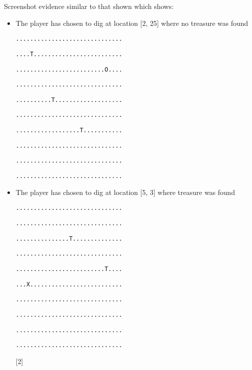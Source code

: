 Screenshot evidence similar to that shown which shows: 
\begin{itemize}
\item The player has chosen to dig at location {[}2, 25{]} where no treasure
was found 

\noindent\begin{minipage}[t]{1\columnwidth}%
\texttt{.............................. }

\texttt{....T......................... }

\texttt{.........................O.... }

\texttt{..............................}

\texttt{..........T................... }

\texttt{.............................. }

\texttt{..................T........... }

\texttt{.............................. }

\texttt{.............................. }

\texttt{..............................}%
\end{minipage}
\item The player has chosen to dig at location {[}5, 3{]} where treasure
was found 

\noindent\begin{minipage}[t]{1\columnwidth}%
\texttt{.............................. }

\texttt{..............................}

\texttt{...............T..............}

\texttt{.............................. }

\texttt{.........................T.... }

\texttt{...X.......................... }

\texttt{.............................. }

\texttt{..............................}

\texttt{.............................. }

\texttt{..............................}%
\end{minipage}

\hfill{} {[}2{]}
\end{itemize}